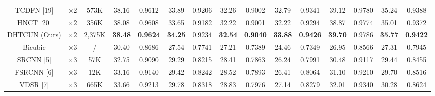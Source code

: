 \documentclass{ieeeaccess}
\begin{document}
\begin{table}
\begin{tabular}{|c|c|c|cc|cc|cc|cc|cc|cc|}
TCDFN [19] & $\times 2$ &573K& \multicolumn{1}{c|}{38.16} & 0.9612 & \multicolumn{1}{c|}{33.89} & 0.9206 & \multicolumn{1}{c|}{32.26} & 0.9002 & \multicolumn{1}{c|}{32.79} &0.9341 & \multicolumn{1}{c|}{39.12} & 0.9780
&\multicolumn{1}{c|}{35.24} & 0.9388\\

HNCT [20] & $\times 2$ &356K& \multicolumn{1}{c|}{38.08} & 0.9608 & \multicolumn{1}{c|}{33.65} & 0.9182 & \multicolumn{1}{c|}{32.22} & 0.9001 & \multicolumn{1}{c|}{32.22} &0.9294 & \multicolumn{1}{c|}{38.87} & 0.9774
&\multicolumn{1}{c|}{35.01} & 0.9372\\

DHTCUN (Ours) & $\times 2$ &2,375K& \multicolumn{1}{c|}{\color{red}\textbf{38.48}} &{\color{red}\textbf{0.9624}} & \multicolumn{1}{c|}{\color{red}\textbf{34.25} } &{\color{blue}\underline{0.9234}} & \multicolumn{1}{c|}{\color{red}\textbf{32.54}} &{\color{red}\textbf{0.9040}}& \multicolumn{1}{c|}{\color{red}\textbf{33.88}} &{\color{red}\textbf{0.9426}}& \multicolumn{1}{c|}{\color{red}\textbf{39.70}} &{\color{blue}\underline{0.9786}} &\multicolumn{1}{c|}{\color{red}\textbf{35.77}} & {\color{red}\textbf{0.9422}}\\
\hline

Bicubic&$\times3$ &-/-& \multicolumn{1}{c|}{30.40} & 0.8686  & \multicolumn{1}{c|}{27.54} & 0.7741 & \multicolumn{1}{c|}{27.21} & 0.7389 & \multicolumn{1}{c|}{24.46} & 0.7349  & \multicolumn{1}{c|}{26.95} &0.8566
&\multicolumn{1}{c|}{27.31} & 0.7945\\

SRCNN [5] & $\times3$ & 57K&\multicolumn{1}{c|}{32.75} & 0.9090  & \multicolumn{1}{c|}{29.29} & 0.8215  &\multicolumn{1}{c|}{28.41} & 0.7863  & \multicolumn{1}{c|}{26.24} &0.7991 & \multicolumn{1}{c|}{30.48} &0.9117
&\multicolumn{1}{c|}{29.44} & 0.8455\\

FSRCNN [6]& $\times3$ &12K& \multicolumn{1}{c|}{33.16} &0.9140& \multicolumn{1}{c|}{29.42} & 0.8242 &\multicolumn{1}{c|}{28.52} & 0.7893& \multicolumn{1}{c|}{26.41} &0.8064& \multicolumn{1}{c|}{31.10} &0.9210
&\multicolumn{1}{c|}{29.70} & 0.8516\\

VDSR [7]& $\times3$ &665K& \multicolumn{1}{c|}{33.66} & 0.9213 & \multicolumn{1}{c|}{29.78} & 0.8318 &\multicolumn{1}{c|}{28.83} & 0.7976& \multicolumn{1}{c|}{27.14} & 0.8279 & \multicolumn{1}{c|}{32.01} & 0.9340
&\multicolumn{1}{c|}{30.28} & 0.8624\\


\end{tabular}
\end{table}
\end{document}
